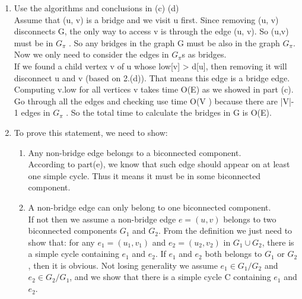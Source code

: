 \documentclass[paper=a4, fontsize=11pt]{scrartcl} %
\numberwithin{equation}{section} %
\numberwithin{figure}{section} %
\numberwithin{table}{section} %
\begin{document}
\begin{enumerate}[label={2.(\alph*)}]
  \item 
Use the algorithms and conclusions in (c)  (d)\\
 Assume that (u, v) is a bridge and  we visit u first. Since removing (u, v) disconnects G, the only way to access v is through the edge (u, v). So (u,v) must be in ${G_\pi}$ . So any bridges in the graph G must be also in the graph ${G_\pi}$. Now we only need to consider the edges in ${G_\pi}$s as bridges. \\
If we found a child vertex v of u whose low[v] > d[u], then removing it will disconnect u and v (based on 2.(d)). That means this edge is a  bridge edge.
Computing v.low for all vertices v takes time O(E) as we showed in part (c). Go through all the edges and checking use time O(V ) because  there are |V|- 1 edges in ${G_\pi}$ . So the total time to calculate the bridges in G is O(E).


  \item 

  To prove this statement, we need to show:
  \begin{enumerate}
    \item Any non-bridge edge belongs to a biconnected component.\\
      According to part(e), we know that such edge should appear on at least one simple cycle. Thus it means it must be in some biconnected component.
    \item A non-bridge edge can only belong to one biconnected component.\\
      If not then we assume a non-bridge edge $e=(u,v)$ belongs to two
      biconnected components $G_1$ and $G_2$. From the definition we just need
      to show that: for any $e_1=(u_1,v_1)$ and $e_2=(u_2,v_2)$ in $G_1 \cup G_2$, there is a
      simple cycle containing $e_1$ and $e_2$. If $e_1$ and $e_2$ both belongs
      to $G_1$ or $G_2$, then it is obvious.  Not losing generality we assume
      $e_1 \in G_1/G_2$ and $e_2 \in G_2/G_1$, and we show that there is a
      simple cycle C containing $e_1$ and $e_2$.\\


\end{enumerate}
\end{enumerate}
\end{document}
